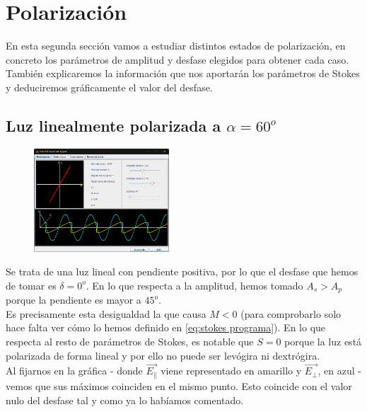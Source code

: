 \documentclass[11pt]{article}
\begin{document}
    \section{Polarización}
    \noindent En esta segunda sección vamos a estudiar distintos estados de polarización, en concreto los parámetros de amplitud y desfase elegidos para obtener cada caso. También explicaremos la información que nos aportarán los parámetros de Stokes y deduciremos gráficamente el valor del desfase.
    \subsection{Luz linealmente polarizada a $\alpha = 60^o$}
    \begin{figure}
        \vspace{-0.5cm}
        \centering
        \includegraphics[width=0.45\textwidth]{fotos/luz lin pol 60.png}
    \end{figure}
    
    \noindent Se trata de una luz lineal con pendiente positiva, por lo que el desfase que hemos de tomar es $\delta = 0^o$. En lo que respecta a la amplitud, hemos tomado $A_s > A_p$ porque la pendiente es mayor a $45^o$. \\
    
    \noindent Es precisamente esta desigualdad la que causa $M < 0$ (para comprobarlo solo hace falta ver cómo lo hemos definido en \ref{eq:stokes programa}). En lo que respecta al resto de parámetros de Stokes, es notable que $S = 0$ porque la luz está polarizada de forma lineal y por ello no puede ser levógira ni dextrógira.\\

    \noindent Al fijarnos en la gráfica - donde $\Vec{E_\parallel}$ viene representado en amarillo y $\Vec{E_\perp}$, en azul - vemos que sus máximos coinciden en el mismo punto. Esto coincide con el valor nulo del desfase tal y como ya lo habíamos comentado.
    
\end{document}
